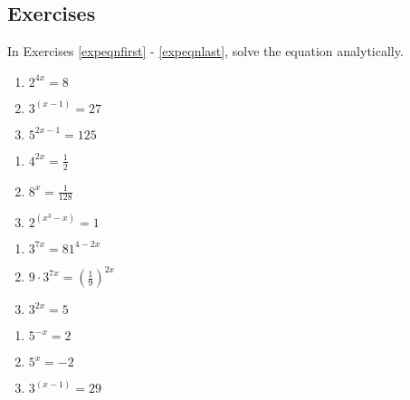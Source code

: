 \newpage

\subsection{Exercises}


In Exercises \ref{expeqnfirst} - \ref{expeqnlast}, solve the equation analytically.

\begin{multicols}{3}
\begin{enumerate}

\item $2^{4x} = 8$  \label{expeqnfirst} 
\item $3^{(x - 1)} = 27$  
\item $5^{2x-1} = 125$ 

\setcounter{HW}{\value{enumi}}
\end{enumerate}
\end{multicols}

\begin{multicols}{3}
\begin{enumerate}
\setcounter{enumi}{\value{HW}}

\item $4^{2x} = \frac{1}{2}$
\item $8^{x} = \frac{1}{128}$ 
\item $2^{(x^{3} - x)} = 1$ 

\setcounter{HW}{\value{enumi}}
\end{enumerate}
\end{multicols}

\begin{multicols}{3}
\begin{enumerate}
\setcounter{enumi}{\value{HW}}

\item $3^{7x} = 81^{4-2x}$ 
\item $9 \cdot 3^{7x} = \left(\frac{1}{9}\right)^{2x}$ 
\item $3^{2x} = 5$ 

\setcounter{HW}{\value{enumi}}
\end{enumerate}
\end{multicols}

\begin{multicols}{3}
\begin{enumerate}
\setcounter{enumi}{\value{HW}}

\item $5^{-x} = 2$ 
\item $5^{x} = -2$  
\item $3^{(x - 1)} = 29$  

\setcounter{HW}{\value{enumi}}
\end{enumerate}
\end{multicols}

